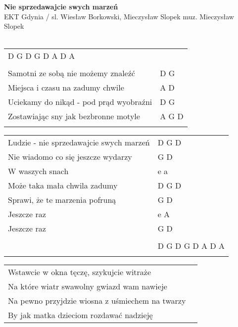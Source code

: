 \documentclass[a5paper]{article}
\begin{document}


\noindent
\fontsize{12pt}{15pt}\selectfont
\textbf{Nie sprzedawajcie swych marzeń} \\
\fontsize{8pt}{10pt}\selectfont
EKT Gdynia / sl. Wiesław Borkowski, Mieczysław Slopek muz. Mieczysław Slopek \\ \\
\fontsize{10pt}{12pt}\selectfont
{}
\begin{tabular}{@{}p{8.00cm}p{3cm}@{}}
\noindent
D G  D G  D A  D A \\ \\

Samotni ze sobą nie możemy znaleźć & D G \\
Miejsca i czasu na zadumy chwile & A D \\
Uciekamy do nikąd - pod prąd wyobraźni & D G \\
Zostawiając sny jak bezbronne motyle & A G D \\ \\
\end{tabular}

\noindent
\begin{tabular}{@{}p{7.00cm}p{3cm}@{}}
Ludzie - nie sprzedawajcie swych marzeń & D G D \\
Nie wiadomo co się jeszcze wydarzy & G D \\
W waszych snach & e a \\
Może taka mała chwila zadumy & D G D \\
Sprawi, że te marzenia pofruną & G D \\
Jeszcze raz & e A \\
Jeszcze raz & G D \\ \\
& D G  D G  D A  D A \\ \\
\end{tabular}

\noindent
\begin{tabular}{@{}p{7.00cm}p{3cm}@{}}
Wstawcie w okna tęczę, szykujcie witraże \\
Na które wiatr swawolny gwiazd wam nawieje \\
Na pewno przyjdzie wiosna z uśmiechem na twarzy \\
By jak matka dzieciom rozdawać nadzieję \\
\end{tabular}
\end{document}
